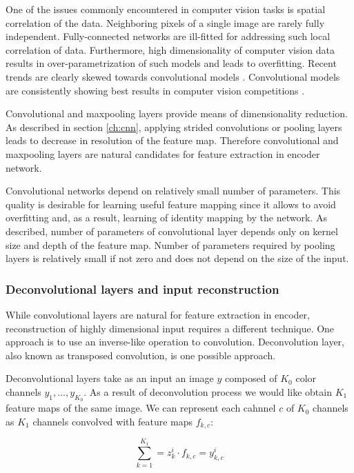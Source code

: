 One of the issues commonly encountered in computer vision tasks is spatial correlation of the data.
Neighboring pixels of a single image are rarely fully independent.
Fully-connected networks are ill-fitted for addressing such local correlation of data.
Furthermore, high dimensionality of computer vision data results in over-parametrization of such models and leads to overfitting.
Recent trends are clearly skewed towards convolutional models \cite{He2015, Szegedy2016}.
Convolutional models are consistently showing best results in computer vision competitions \cite{ILSVRC15, Zhou2016}.

Convolutional and maxpooling layers provide means of dimensionality reduction.
As described in section \ref{ch:cnn}, applying strided convolutions or pooling layers leads to decrease in resolution of the feature map.
Therefore convolutional and maxpooling layers are natural candidates for feature extraction in encoder network.

Convolutional networks depend on relatively small number of parameters.
This quality is desirable for learning useful feature mapping since it allows to avoid overfitting and, as a result, learning of identity mapping by the network.
As described, number of parameters of convolutional layer depends only on kernel size and depth of the feature map.
Number of parameters required by pooling layers is relatively small if not zero and does not depend on the size of the input.

\subsubsection{Deconvolutional layers and input reconstruction}

While convolutional layers are natural for feature extraction in encoder, reconstruction of highly dimensional input requires a different technique.
One approach is to use an inverse-like operation to convolution.
Deconvolution layer, also known as transposed convolution, is one possible approach.

Deconvolutional layers \cite{Zeiler2010} take as an input an image $y$ composed of $K_0$ color channels $y_1, ... , y_{K_0}$.
As a result of deconvolution process we would like obtain $K_1$ feature maps of the same image.
We can represent each cahnnel $c$ of $K_0$ channels as $K_1$ channels convolved with feature maps $f_{k,c}$:

\begin{equation}\label{eq:de}
  \sum^{K_1}_{k=1}=z^i_k \cdot f_{k,c} = y^i_{k,c}
\end{equation}


